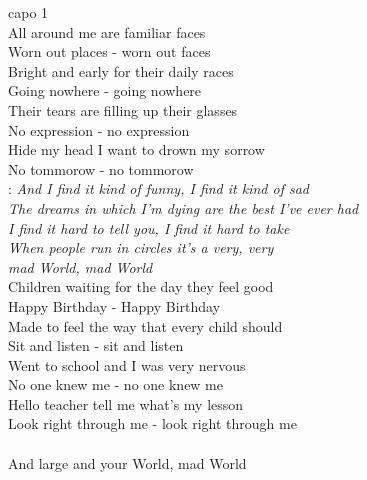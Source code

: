 
\hfill capo 1\\

All around me are familiar faces\\
Worn out places - worn out faces\\
Bright and early for their daily races\\
Going nowhere - going nowhere\\
Their tears are filling up their glasses\\
No expression - no expression\\
Hide my head I want to drown my sorrow\\
No tommorow - no tommorow\\

\textregistered: \emph{And I find it kind of funny, I find it kind of sad\\
The dreams in which I'm dying are the best I've ever had\\
I find it hard to tell you, I find it hard to take\\
When people run in circles it's a very, very\\
mad World, mad World}\\

Children waiting for the day they feel good\\
Happy Birthday - Happy Birthday\\
Made to feel the way that every child should\\
Sit and listen - sit and listen\\
Went to school and I was very nervous\\
No one knew me - no one knew me\\
Hello teacher tell me what's my lesson\\
Look right through me - look right through me\\

\textregistered\\
And large and your World, mad World

\newpage

